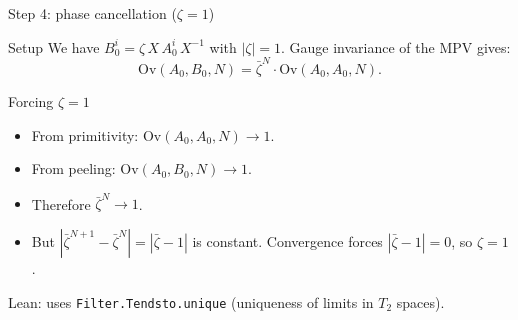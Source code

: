 \documentclass[aspectratio=169,10pt]{beamer}
\newcommand{\Ov}{\mathrm{Ov}}
\begin{document}
\begin{frame}{Step 4: phase cancellation ($\zeta = 1$)}
    \vspace{-0.6em}

    \begin{block}{Setup}
        We have $B_0^i = \zeta\,X\,A_0^i\,X^{-1}$ with $|\zeta|=1$.
        Gauge invariance of the MPV gives:
        \[
            \Ov(A_0,B_0,N) = \bar\zeta^N \cdot \Ov(A_0,A_0,N).
        \]
    \end{block}

    \begin{block}{Forcing $\zeta = 1$}
        \begin{itemize}\itemsep0.15em
            \item From primitivity: $\Ov(A_0,A_0,N) \to 1$.
            \item From peeling: $\Ov(A_0,B_0,N) \to 1$.
            \item Therefore $\bar\zeta^N \to 1$.
            \item But $|\bar\zeta^{N+1}-\bar\zeta^N|=|\bar\zeta-1|$ is constant.
                  Convergence forces $|\bar\zeta-1|=0$, so \alert{$\zeta = 1$}.
        \end{itemize}
    \end{block}

    \textcolor{dimwhite}{\footnotesize Lean: uses \texttt{Filter.Tendsto.unique} (uniqueness of limits in $T_2$ spaces).}
\end{frame}
\end{document}
